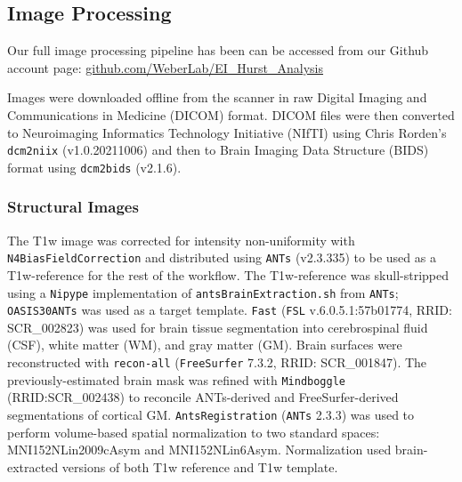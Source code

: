 \documentclass[
true
]{sn-jnl}
\begin{document}
\subsection{Image Processing}\label{image-processing}

Our full image processing pipeline has been can be accessed from our
Github account page:
\href{https://github.com/WeberLab/EI_Hurst_Analysis}{github.com/WeberLab/EI\_Hurst\_Analysis}

Images were downloaded offline from the scanner in raw Digital Imaging
and Communications in Medicine (DICOM) format. DICOM files were then
converted to Neuroimaging Informatics Technology Initiative (NIfTI)
using Chris Rorden's \texttt{dcm2niix}
\citep{liFirstStepNeuroimaging2016} (v1.0.20211006) and then to Brain
Imaging Data Structure (BIDS) \citep{gorgolewskiBrainImagingData2016}
format using \texttt{dcm2bids} \citep{boreDcm2Bids2023} (v2.1.6).

\subsubsection{Structural Images}\label{structural-images}

The T1w image was corrected for intensity non-uniformity with
\texttt{N4BiasFieldCorrection} \citep{tustisonN4ITKImprovedN32010} and
distributed using \texttt{ANTs}
\citep{avantsSymmetricDiffeomorphicImage2008} (v2.3.335) to be used as a
T1w-reference for the rest of the workflow. The T1w-reference was
skull-stripped using a \texttt{Nipype}
\citep{gorgolewskiNipypeFlexibleLightweight2016} implementation of
\texttt{antsBrainExtraction.sh} from \texttt{ANTs}; \texttt{OASIS30ANTs}
was used as a target template. \texttt{Fast}
\citep{zhangSegmentationBrainMR2001} (\texttt{FSL}
\citep{smithAdvancesFunctionalStructural2004} v.6.0.5.1:57b01774, RRID:
SCR\_002823) was used for brain tissue segmentation into cerebrospinal
fluid (CSF), white matter (WM), and gray matter (GM). Brain surfaces
were reconstructed with \texttt{recon-all}
\citep{daleCorticalSurfacebasedAnalysis1999} (\texttt{FreeSurfer}
\citep{daleCorticalSurfacebasedAnalysis1999} 7.3.2, RRID: SCR\_001847).
The previously-estimated brain mask was refined with \texttt{Mindboggle}
\citep{kleinMindbogglingMorphometryHuman2017} (RRID:SCR\_002438) to
reconcile ANTs-derived and FreeSurfer-derived segmentations of cortical
GM. \texttt{AntsRegistration}
\citep{avantsSymmetricDiffeomorphicImage2008} (\texttt{ANTs} 2.3.3) was
used to perform volume-based spatial normalization to two standard
spaces: MNI152NLin2009cAsym and MNI152NLin6Asym. Normalization used
brain-extracted versions of both T1w reference and T1w template.
\end{document}
